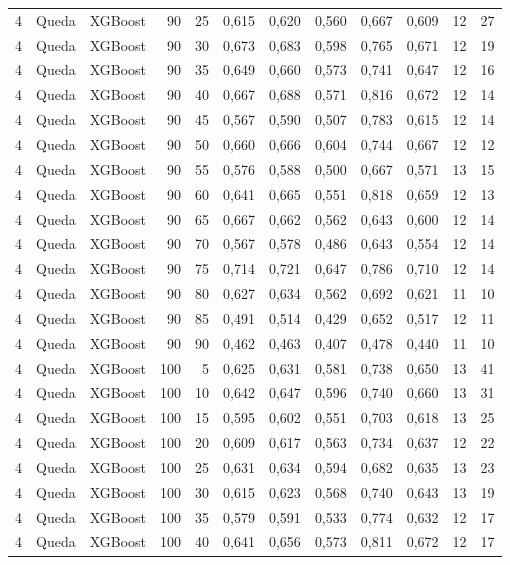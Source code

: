 \begin{longtable}{@{}rllrrrrrrrrr@{}}
4 & Queda & XGBoost & 90 & 25 & 0,615 & 0,620 & 0,560 & 0,667 & 0,609 & 12 & 27 \\
4 & Queda & XGBoost & 90 & 30 & 0,673 & 0,683 & 0,598 & 0,765 & 0,671 & 12 & 19 \\
4 & Queda & XGBoost & 90 & 35 & 0,649 & 0,660 & 0,573 & 0,741 & 0,647 & 12 & 16 \\
4 & Queda & XGBoost & 90 & 40 & 0,667 & 0,688 & 0,571 & 0,816 & 0,672 & 12 & 14 \\
4 & Queda & XGBoost & 90 & 45 & 0,567 & 0,590 & 0,507 & 0,783 & 0,615 & 12 & 14 \\
4 & Queda & XGBoost & 90 & 50 & 0,660 & 0,666 & 0,604 & 0,744 & 0,667 & 12 & 12 \\
4 & Queda & XGBoost & 90 & 55 & 0,576 & 0,588 & 0,500 & 0,667 & 0,571 & 13 & 15 \\
4 & Queda & XGBoost & 90 & 60 & 0,641 & 0,665 & 0,551 & 0,818 & 0,659 & 12 & 13 \\
4 & Queda & XGBoost & 90 & 65 & 0,667 & 0,662 & 0,562 & 0,643 & 0,600 & 12 & 14 \\
4 & Queda & XGBoost & 90 & 70 & 0,567 & 0,578 & 0,486 & 0,643 & 0,554 & 12 & 14 \\
4 & Queda & XGBoost & 90 & 75 & 0,714 & 0,721 & 0,647 & 0,786 & 0,710 & 12 & 14 \\
4 & Queda & XGBoost & 90 & 80 & 0,627 & 0,634 & 0,562 & 0,692 & 0,621 & 11 & 10 \\
4 & Queda & XGBoost & 90 & 85 & 0,491 & 0,514 & 0,429 & 0,652 & 0,517 & 12 & 11 \\
4 & Queda & XGBoost & 90 & 90 & 0,462 & 0,463 & 0,407 & 0,478 & 0,440 & 11 & 10 \\
4 & Queda & XGBoost & 100 & 5 & 0,625 & 0,631 & 0,581 & 0,738 & 0,650 & 13 & 41 \\
4 & Queda & XGBoost & 100 & 10 & 0,642 & 0,647 & 0,596 & 0,740 & 0,660 & 13 & 31 \\
4 & Queda & XGBoost & 100 & 15 & 0,595 & 0,602 & 0,551 & 0,703 & 0,618 & 13 & 25 \\
4 & Queda & XGBoost & 100 & 20 & 0,609 & 0,617 & 0,563 & 0,734 & 0,637 & 12 & 22 \\
4 & Queda & XGBoost & 100 & 25 & 0,631 & 0,634 & 0,594 & 0,682 & 0,635 & 13 & 23 \\
4 & Queda & XGBoost & 100 & 30 & 0,615 & 0,623 & 0,568 & 0,740 & 0,643 & 13 & 19 \\
4 & Queda & XGBoost & 100 & 35 & 0,579 & 0,591 & 0,533 & 0,774 & 0,632 & 12 & 17 \\
4 & Queda & XGBoost & 100 & 40 & 0,641 & 0,656 & 0,573 & 0,811 & 0,672 & 12 & 17 \\

\end{longtable}
